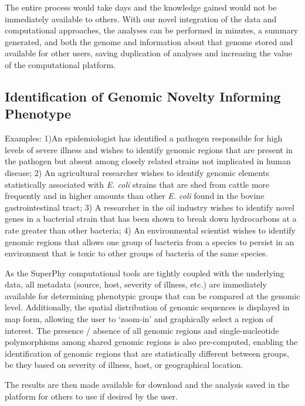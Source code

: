 \documentclass[a4paper,twoside]{article}
\begin{document}
The entire process would take days and the knowledge gained would not be immediately available to others. With our novel integration of the data and computational approaches, the analyses can be performed in minutes, a summary generated, and both the genome and
information about that genome stored and available for other users, saving duplication of analyses and increasing the value of the computational platform.

\subsection{Identification of Genomic Novelty Informing Phenotype}
Examples: 1)An epidemiologist has identified a pathogen responsible for high levels of severe illness and wishes to identify genomic regions that are present in the pathogen but absent among closely related strains not implicated in human disease; 2) An agricultural researcher wishes to identify genomic elements statistically associated with \textit{E. coli} strains that are shed from cattle more frequently and in higher amounts than other \textit{E. coli} found in the bovine gastrointestinal tract; 3) A researcher in the oil industry wishes to identify novel genes in a bacterial strain that has been shown to break down hydrocarbons at a rate greater than other bacteria; 4) An  environmental scientist wishes to identify genomic regions that allows one group of bacteria from a species to persist in an environment that is toxic to other groups of bacteria of the same species.

As the SuperPhy computational tools are tightly coupled with the underlying data, all metadata (source, host, severity of illness, etc.) are immediately available for determining phenotypic groups that can be compared at the genomic level. Additionally, the spatial distribution of genomic sequences is displayed in map form, allowing the user to `zoom-in' and graphically select a region of interest. The presence / absence of all genomic regions and single-nucleotide polymorphisms among shared genomic regions is also pre-computed, enabling the identification of genomic regions that are statistically different between groups, be they based on severity of illness, host, or geographical location.

The results are then made available for download and the analysis saved in the platform for others to use if desired by the user.
\end{document}
